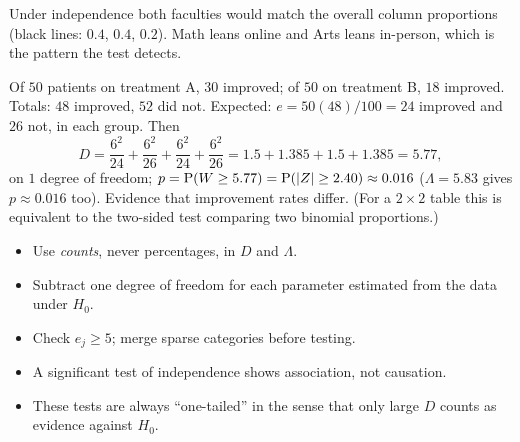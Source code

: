 \begin{center}
\end{center}
Under independence both faculties would match the overall column proportions (black lines:
$0.4$, $0.4$, $0.2$). Math leans online and Arts leans in-person, which is the pattern
the test detects.

\begin{example}
Of $50$ patients on treatment A, $30$ improved; of $50$ on treatment B, $18$ improved.
Totals: $48$ improved, $52$ did not. Expected: $e = 50(48)/100 = 24$ improved and $26$ not,
in each group. Then
\[
D = \frac{6^2}{24}+\frac{6^2}{26}+\frac{6^2}{24}+\frac{6^2}{26} = 1.5 + 1.385 + 1.5 + 1.385 = 5.77,
\]
on $1$ degree of freedom; $p = \operatorname{P}(W\ge 5.77) = \operatorname{P}(|Z|\ge 2.40) \approx 0.016$
($\Lambda = 5.83$ gives $p\approx 0.016$ too). Evidence that improvement rates differ.
(For a $2\times2$ table this is equivalent to the two-sided test comparing two binomial
proportions.)
\end{example}

\begin{important}
\begin{itemize}
  \item Use \emph{counts}, never percentages, in $D$ and $\Lambda$.
  \item Subtract one degree of freedom for each parameter estimated from the data under
        $H_0$.
  \item Check $e_j\ge5$; merge sparse categories before testing.
  \item A significant test of independence shows association, not causation.
  \item These tests are always ``one-tailed'' in the sense that only large $D$ counts as
        evidence against $H_0$.
\end{itemize}
\end{important}

